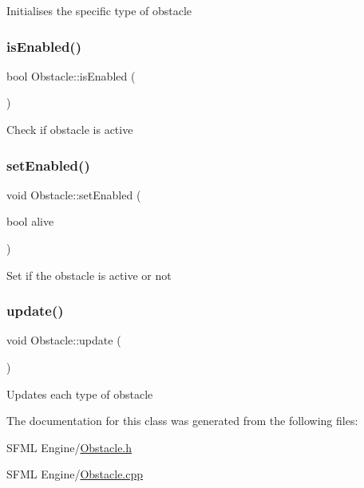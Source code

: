 Initialises the specific type of obstacle \mbox{\label{class_obstacle_a3e5e80b8d4f5e46636bd5fa960621270}} 
\subsubsection{\texorpdfstring{is\+Enabled()}{isEnabled()}}
{\footnotesize\ttfamily bool Obstacle\+::is\+Enabled (\begin{DoxyParamCaption}{ }\end{DoxyParamCaption})}

Check if obstacle is active \mbox{\label{class_obstacle_acce43c25bc4336bcd1d2ceb443d50a54}} 
\subsubsection{\texorpdfstring{set\+Enabled()}{setEnabled()}}
{\footnotesize\ttfamily void Obstacle\+::set\+Enabled (\begin{DoxyParamCaption}\item[{bool}]{alive }\end{DoxyParamCaption})}

Set if the obstacle is active or not \mbox{\label{class_obstacle_a3fe041a93f5b2e9e5c5750bcef2382a4}} 
\subsubsection{\texorpdfstring{update()}{update()}}
{\footnotesize\ttfamily void Obstacle\+::update (\begin{DoxyParamCaption}{ }\end{DoxyParamCaption})}

Updates each type of obstacle 

The documentation for this class was generated from the following files\+:\begin{DoxyCompactItemize}
\item 
S\+F\+M\+L Engine/\hyperlink{_obstacle_8h}{Obstacle.\+h}\item 
S\+F\+M\+L Engine/\hyperlink{_obstacle_8cpp}{Obstacle.\+cpp}\end{DoxyCompactItemize}
